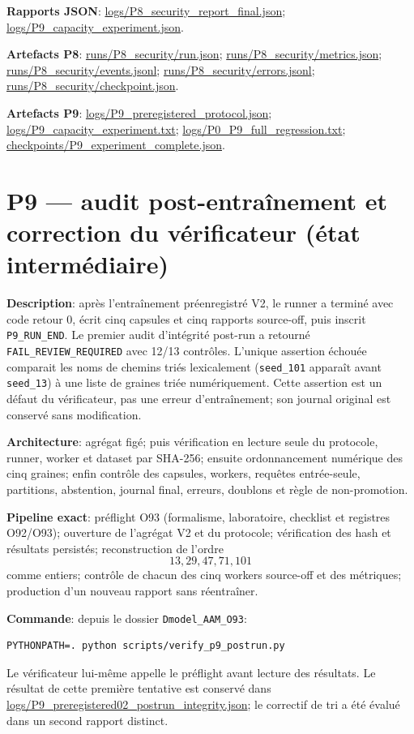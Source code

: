\documentclass[11pt,a4paper,oneside]{report}
\begin{document}
\textbf{Rapports JSON}: \url{logs/P8_security_report_final.json}; \url{logs/P9_capacity_experiment.json}.

\textbf{Artefacts P8}:
\url{runs/P8_security/run.json}; \url{runs/P8_security/metrics.json}; \url{runs/P8_security/events.jsonl}; \url{runs/P8_security/errors.jsonl}; \url{runs/P8_security/checkpoint.json}.

\textbf{Artefacts P9}:
\url{logs/P9_preregistered_protocol.json}; \url{logs/P9_capacity_experiment.txt}; \url{logs/P0_P9_full_regression.txt}; \url{checkpoints/P9_experiment_complete.json}.


\chapter{P9 — audit post-entraînement et correction du vérificateur (état intermédiaire)}
\textbf{Description}: après l'entraînement préenregistré V2, le runner a terminé avec code retour 0, écrit cinq capsules et cinq rapports source-off, puis inscrit \texttt{P9\_RUN\_END}. Le premier audit d'intégrité post-run a retourné \texttt{FAIL\_REVIEW\_REQUIRED} avec 12/13 contrôles. L'unique assertion échouée comparait les noms de chemins triés lexicalement (\texttt{seed\_101} apparaît avant \texttt{seed\_13}) à une liste de graines triée numériquement. Cette assertion est un défaut du vérificateur, pas une erreur d'entraînement; son journal original est conservé sans modification.

\textbf{Architecture}: agrégat figé; puis vérification en lecture seule du protocole, runner, worker et dataset par SHA-256; ensuite ordonnancement numérique des cinq graines; enfin contrôle des capsules, workers, requêtes entrée-seule, partitions, abstention, journal final, erreurs, doublons et règle de non-promotion.

\textbf{Pipeline exact}: préflight O93 (formalisme, laboratoire, checklist et registres O92/O93); ouverture de l'agrégat V2 et du protocole; vérification des hash et résultats persistés; reconstruction de l'ordre \[13,29,47,71,101\] comme entiers; contrôle de chacun des cinq workers source-off et des métriques; production d'un nouveau rapport sans réentraîner.

\textbf{Commande}: depuis le dossier \texttt{Dmodel\_AAM\_O93}:
\begin{lstlisting}[basicstyle=\ttfamily\small,breaklines=true]
PYTHONPATH=. python scripts/verify_p9_postrun.py
\end{lstlisting}
Le vérificateur lui-même appelle le préflight avant lecture des résultats. Le résultat de cette première tentative est conservé dans \url{logs/P9_preregistered02_postrun_integrity.json}; le correctif de tri a été évalué dans un second rapport distinct.
\end{document}

